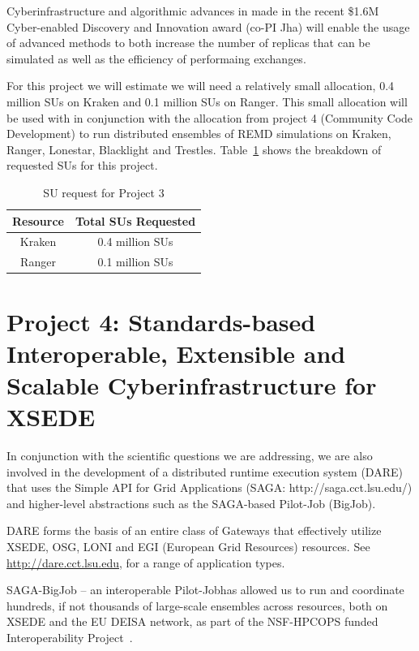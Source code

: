 \documentclass[a4paper,11pt]{article}
\newcommand{\up}{\vspace*{-1em}}
\begin{document}
Cyberinfrastructure and algorithmic advances in made in the recent \$1.6M Cyber-enabled Discovery and Innovation award (co-PI Jha) will enable the usage of advanced methods to both increase the number of replicas that can be simulated as well as the efficiency of performaing exchanges.



For this project we will estimate we will need a relatively small allocation, 0.4 million SUs on Kraken and 0.1 million SUs on Ranger. This small allocation will be used with in conjunction with the allocation from project 4 (Community Code Development) to run distributed ensembles of REMD simulations on Kraken, Ranger, Lonestar, Blacklight and Trestles. Table~\ref{table:project3} shows the breakdown of requested SUs for this project.


\begin{table}[!h]
\begin{center}
\begin{tabular}{|c|c| }
\hline 
Resource & Total SUs Requested \\ 
\hline
Kraken   & 0.4 million SUs \\
\hline
Ranger   & 0.1 million SUs \\
\hline
\end{tabular}
\end{center}
  \caption{SU request for Project 3}\label{table:project3}
\up
\end{table}



\section{Project 4: Standards-based Interoperable, Extensible and Scalable Cyberinfrastructure for XSEDE}
In conjunction with the scientific questions we are addressing, we are also involved in the development of a distributed runtime execution system (DARE) that uses the Simple API for Grid Applications (SAGA: http://saga.cct.lsu.edu/)
and higher-level abstractions such as the SAGA-based Pilot-Job (BigJob).

DARE forms the basis of an entire class of Gateways that effectively utilize XSEDE, OSG, LONI and EGI (European Grid Resources) resources. See \url{http://dare.cct.lsu.edu}, for a range of application types.

SAGA-BigJob -- an interoperable Pilot-Jobhas allowed us to run and coordinate hundreds, if not thousands of large-scale ensembles across resources, both on XSEDE and the EU DEISA network, as part of the NSF-HPCOPS funded Interoperability Project~\cite{tg-vph-interop}.  
\end{document}
